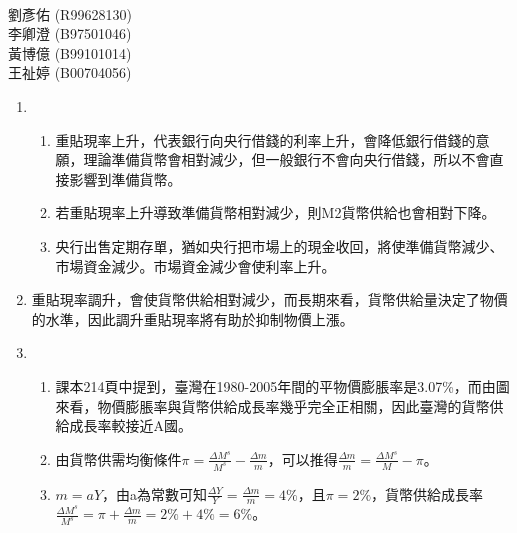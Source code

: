 \documentclass[12pt]{article}
\begin{document}
\begin{CJK}{UTF8}{cwmb}
\renewcommand{\figurename}{圖}

\voffset=-1cm
\textwidth=5.6in
\textheight=9.2in

\newenvironment{num}
 {\leftmargini=6mm\leftmarginii=8mm
  \begin{enumerate}\itemsep=-2pt}
 {\end{enumerate}}

\newenvironment{sol}
 {\begin{quote}\mbox{}\llap{\color{blue}{解答:}\rule{10mm}{0pt}}\hspace*{-4pt}}{\end{quote}}


\thispagestyle{empty}
\fontsize{12}{20pt}\selectfont
\begin{center}
{\large{}}\\[3mm]
劉彥佑 (R99628130)\\
李卿澄 (B97501046)\\
黃博億 (B99101014)\\
王祉婷 (B00704056)
\end{center}

\begin{num}
\item 
	\begin{num}
		\item 重貼現率上升，代表銀行向央行借錢的利率上升，會降低銀行借錢的意願，理論準備貨幣會相對減少，但一般銀行不會向央行借錢，所以不會直接影響到準備貨幣。
		\item 若重貼現率上升導致準備貨幣相對減少，則M2貨幣供給也會相對下降。
		\item 央行出售定期存單，猶如央行把市場上的現金收回，將使準備貨幣減少、市場資金減少。市場資金減少會使利率上升。
	\end{num}
\item 重貼現率調升，會使貨幣供給相對減少，而長期來看，貨幣供給量決定了物價的水準，因此調升重貼現率將有助於抑制物價上漲。
\item 
	\begin{num}
		\item 課本214頁中提到，臺灣在1980-2005年間的平物價膨脹率是3.07\%，而由圖來看，物價膨脹率與貨幣供給成長率幾乎完全正相關，因此臺灣的貨幣供給成長率較接近A國。
		\item 由貨幣供需均衡條件$\pi=\frac{\Delta M^s}{M^s}-\frac{\Delta m}{m}$，可以推得$\frac{\Delta m}{m}=\frac{\Delta M^s}{M}-\pi$。
		\item $m=aY$，由a為常數可知$\frac{\Delta Y}{Y} = \frac{\Delta m}{m} = 4\%$，且$\pi = 2\%$，貨幣供給成長率$\frac{\Delta M^s}{M^s} = \pi + \frac{\Delta m}{m} = 2\% + 4\% = 6\%$。
	\end{num}
\end{num}
\end{CJK}
\end{document}

